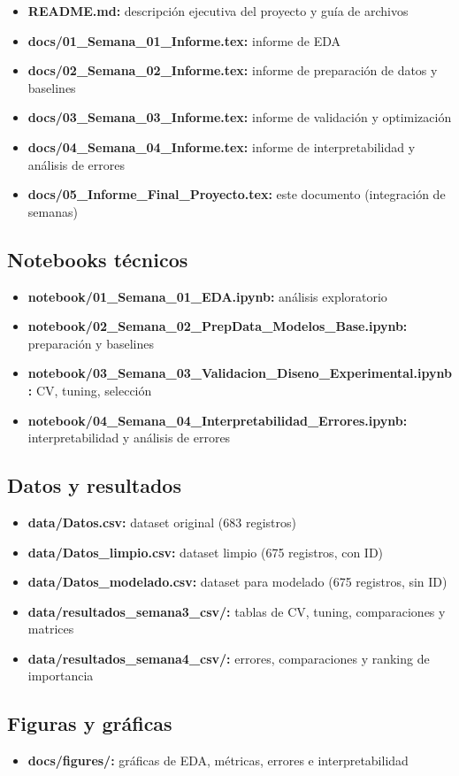 \documentclass[11pt,a4paper]{article}
\begin{document}
\begin{itemize}[leftmargin=1.4cm]
\item \textbf{README.md:} descripción ejecutiva del proyecto y guía de archivos
\item \textbf{docs/01\_Semana\_01\_Informe.tex:} informe de EDA
\item \textbf{docs/02\_Semana\_02\_Informe.tex:} informe de preparación de datos y baselines
\item \textbf{docs/03\_Semana\_03\_Informe.tex:} informe de validación y optimización
\item \textbf{docs/04\_Semana\_04\_Informe.tex:} informe de interpretabilidad y análisis de errores
\item \textbf{docs/05\_Informe\_Final\_Proyecto.tex:} este documento (integración de semanas)
\end{itemize}

\subsection{Notebooks técnicos}

\begin{itemize}[leftmargin=1.4cm]
\item \textbf{notebook/01\_Semana\_01\_EDA.ipynb:} análisis exploratorio
\item \textbf{notebook/02\_Semana\_02\_PrepData\_Modelos\_Base.ipynb:} preparación y baselines
\item \textbf{notebook/03\_Semana\_03\_Validacion\_Diseno\_Experimental.ipynb:} CV, tuning, selección
\item \textbf{notebook/04\_Semana\_04\_Interpretabilidad\_Errores.ipynb:} interpretabilidad y análisis de errores
\end{itemize}

\subsection{Datos y resultados}

\begin{itemize}[leftmargin=1.4cm]
\item \textbf{data/Datos.csv:} dataset original (683 registros)
\item \textbf{data/Datos\_limpio.csv:} dataset limpio (675 registros, con ID)
\item \textbf{data/Datos\_modelado.csv:} dataset para modelado (675 registros, sin ID)
\item \textbf{data/resultados\_semana3\_csv/:} tablas de CV, tuning, comparaciones y matrices
\item \textbf{data/resultados\_semana4\_csv/:} errores, comparaciones y ranking de importancia
\end{itemize}

\subsection{Figuras y gráficas}

\begin{itemize}[leftmargin=1.4cm]
\item \textbf{docs/figures/:} gráficas de EDA, métricas, errores e interpretabilidad
\end{itemize}
\end{document}
